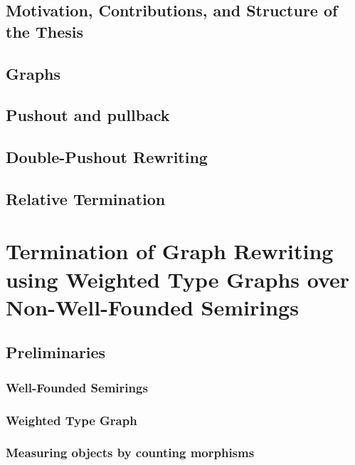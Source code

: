 \documentclass{report}
\begin{document}
\section{Motivation, Contributions, and Structure of the Thesis} 

\section{Graphs}
 
\section{Pushout and pullback}  

\section{Double-Pushout Rewriting}
 
\section{Relative Termination}



\chapter{Termination of Graph Rewriting using Weighted Type Graphs over Non-Well-Founded Semirings} 
\section{Preliminaries}
\subsection{Well-Founded Semirings} 
\label{sec:well_founded_semiring}

\subsection{Weighted Type Graph} 
\label{sec:weighted_type_graph}

%  
\subsection{Measuring objects by counting morphisms}
\label{sec:type_graph:measuring_graphs}

\end{document}
